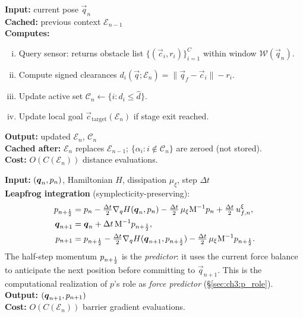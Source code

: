 \begin{mdframed}[linecolor=teal!60!black, linewidth=1pt,
                 frametitle={\small\sffamily\bfseries
                 Box 3.6.1: \textsc{SenseUpdate}},
                 frametitlefont=\small\sffamily\bfseries]
\label{box:sense}
\textbf{Input:} current pose $\vec{q}_n$\\
\textbf{Cached:} previous context $\mathcal{E}_{n-1}$\\
\textbf{Computes:}
\begin{enumerate}[(i)]
  \item Query sensor: returns obstacle list
        $\{(\vec{c}_i,r_i)\}_{i=1}^{C}$ within window $\mathcal{W}(\vec{q}_n)$.
  \item Compute signed clearances
        $d_i(\vec{q};\mathcal{E}_n) = \|\vec{q}_f - \vec{c}_i\| - r_i$.
  \item Update active set $\mathcal{C}_n \leftarrow \{i : d_i \leq \hat{d}\}$.
  \item Update local goal $\vec{c}_{\mathrm{target}}(\mathcal{E}_n)$
        if stage exit reached.
\end{enumerate}
\textbf{Output:} updated $\mathcal{E}_n$, $\mathcal{C}_n$\\
\textbf{Cached after:} $\mathcal{E}_n$ replaces $\mathcal{E}_{n-1}$;
$\{\alpha_i : i \notin \mathcal{C}_n\}$ are zeroed (not stored).\\
\textbf{Cost:} $O(C(\mathcal{E}_n))$ distance evaluations.
\end{mdframed}

\vspace{6pt}

\begin{mdframed}[linecolor=orange!70!black, linewidth=1pt,
                 frametitle={\small\sffamily\bfseries
                 Box 3.6.2: \textsc{SymplecticStep}}]
\label{box:symp}
\textbf{Input:} $(\boldsymbol{q}_n, p_n)$, Hamiltonian $H$,
dissipation $\mu_\xi$, step $\Delta t$\\
\textbf{Leapfrog integration} (symplecticity-preserving):
\begin{align}
  p_{n+\frac{1}{2}}
  &= p_n
     - \tfrac{\Delta t}{2}\nabla_{q}H(\boldsymbol{q}_n,p_n)
     - \tfrac{\Delta t}{2}\,\mu_\xi\mathrm{M}^{-1}p_n
     + \tfrac{\Delta t}{2}\,u_{f,n}^\xi,
  \label{eq:ch3:half_mom} \\
  \boldsymbol{q}_{n+1}
  &= \boldsymbol{q}_n + \Delta t\,\mathrm{M}^{-1}p_{n+\frac{1}{2}},
  \label{eq:ch3:q_update} \\
  p_{n+1}
  &= p_{n+\frac{1}{2}}
     - \tfrac{\Delta t}{2}\nabla_{q}H(\boldsymbol{q}_{n+1},p_{n+\frac{1}{2}})
     - \tfrac{\Delta t}{2}\,\mu_\xi\mathrm{M}^{-1}p_{n+\frac{1}{2}}.
  \label{eq:ch3:full_mom}
\end{align}
The half-step momentum $p_{n+\frac12}$ is the \emph{predictor}:
it uses the current force balance to anticipate the next position
before committing to $\vec{q}_{n+1}$.
This is the computational realization of $p$'s role as
\emph{force predictor} (§\ref{sec:ch3:p_role}).\\
\textbf{Output:} $(\boldsymbol{q}_{n+1}, p_{n+1})$\\
\textbf{Cost:} $O(C(\mathcal{E}_n))$ barrier gradient evaluations.
\end{mdframed}


